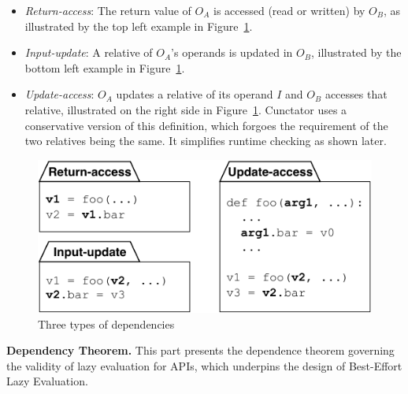 \documentclass[sigconf]{acmart}\settopmatter{printfolios=true,printccs=false,printacmref=false}\setcopyright{none}
\begin{document}
\begin{itemize}
    \item \textit{Return-access}: The return value of $O_A$ is accessed (read or written) by $O_B$, as illustrated by the top left example in Figure~\ref{fig:dependencies}.
    \item \textit{Input-update}: A relative of $O_A$'s operands is updated in $O_B$, illustrated by the bottom left example in Figure~\ref{fig:dependencies}.
    \item \textit{Update-access}: $O_A$ updates a relative of its operand $I$ and $O_B$ accesses that relative, illustrated on the right side in Figure~\ref{fig:dependencies}. Cunctator uses a conservative version of this definition, which forgoes the requirement of the two relatives being the same. It simplifies runtime checking as shown later.
\end{itemize}

\begin{figure}[htbp]
    \centering
    \includegraphics[width=0.8\columnwidth]{figure/dependencies.pdf}
    \caption{Three types of dependencies}
    \label{fig:dependencies}
\end{figure}


\vspace{0.1in}
\noindent\textbf{Dependency Theorem.} This part presents the dependence theorem governing the validity of lazy evaluation for APIs, which underpins the design of Best-Effort Lazy Evaluation.
\end{document}
